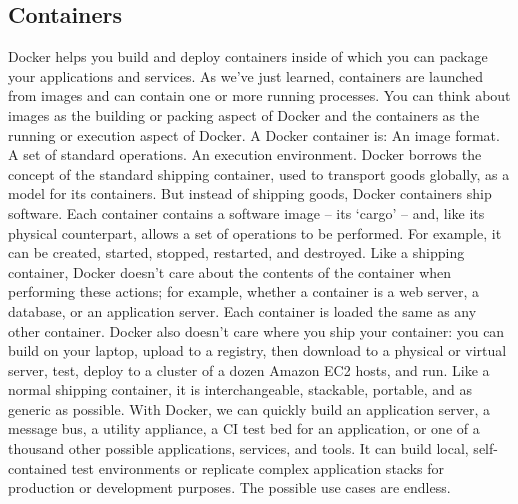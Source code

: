 \subsection{Containers}
Docker helps you build and deploy containers inside of which you can
package your applications and services. As we’ve just learned, containers
are launched from images and can contain one or more running processes.
You can think about images as the building or packing aspect of Docker and
the containers as the running or execution aspect of Docker.
A Docker container is:
An image format.
A set of standard operations.
An execution environment.
Docker borrows the concept of the standard shipping container, used to
transport goods globally, as a model for its containers. But instead of
shipping goods, Docker containers ship software.
Each container contains a software image – its ‘cargo’ – and, like its
physical counterpart, allows a set of operations to be performed. For
example, it can be created, started, stopped, restarted, and destroyed.
Like a shipping container, Docker doesn’t care about the contents of the
container when performing these actions; for example, whether a container
is a web server, a database, or an application server. Each container is
loaded the same as any other container.
Docker also doesn’t care where you ship your container: you can build on
your laptop, upload to a registry, then download to a physical or virtual
server, test, deploy to a cluster of a dozen Amazon EC2 hosts, and run. Like
a normal shipping container, it is interchangeable, stackable, portable, and
as generic as possible.
With Docker, we can quickly build an application server, a message bus, a
utility appliance, a CI test bed for an application, or one of a thousand other
possible applications, services, and tools. It can build local, self-contained
test environments or replicate complex application stacks for production or
development purposes. The possible use cases are endless.

